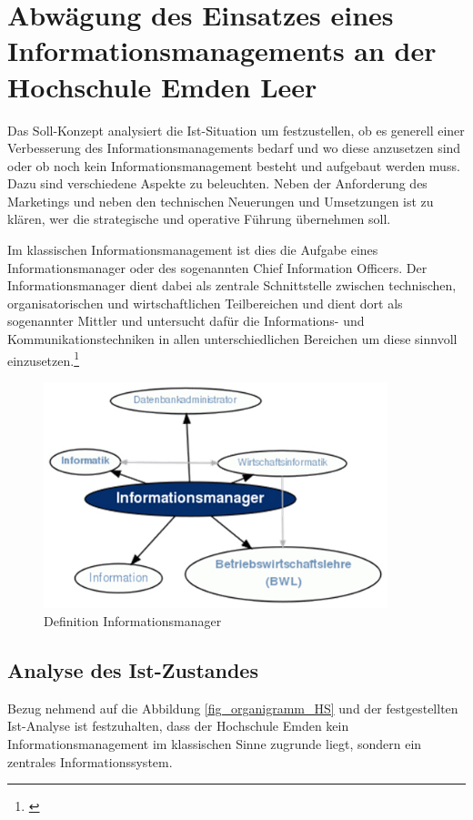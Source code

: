 \section{Abwägung des Einsatzes eines Informationsmanagements an der Hochschule Emden Leer}
Das Soll-Konzept analysiert die Ist-Situation um festzustellen, ob es generell einer Verbesserung des Informationsmanagements bedarf und wo diese anzusetzen sind oder ob noch kein Informationsmanagement besteht und aufgebaut werden muss. Dazu sind verschiedene Aspekte zu beleuchten. Neben der Anforderung des Marketings und neben den  technischen Neuerungen und Umsetzungen ist zu klären, wer die strategische und operative Führung übernehmen soll. 

Im klassischen Informationsmanagement ist dies die Aufgabe eines Informationsmanager oder des sogenannten Chief Information Officers. Der Informationsmanager dient dabei als zentrale Schnittstelle zwischen technischen, organisatorischen und wirtschaftlichen Teilbereichen und dient dort als sogenannter Mittler und untersucht dafür die Informations- und Kommunikationstechniken in allen unterschiedlichen Bereichen um diese sinnvoll einzusetzen.\footnote{\cite[86]{krcmar_einfuhrung_2015}}

\begin{figure}[h!]
	\centering
	\includegraphics[width=10cm]{kapitel/gruppe3/bilder/definition_informationsmanager}
	\caption{Definition Informationsmanager}
	\label{fig_definition_informationsmanager}
\end{figure}

\subsection{Analyse des Ist-Zustandes}
Bezug nehmend auf die Abbildung \ref{fig_organigramm_HS} und der festgestellten Ist-Analyse ist festzuhalten, dass der Hochschule Emden kein Informationsmanagement im klassischen Sinne zugrunde liegt, sondern ein zentrales Informationssystem.

